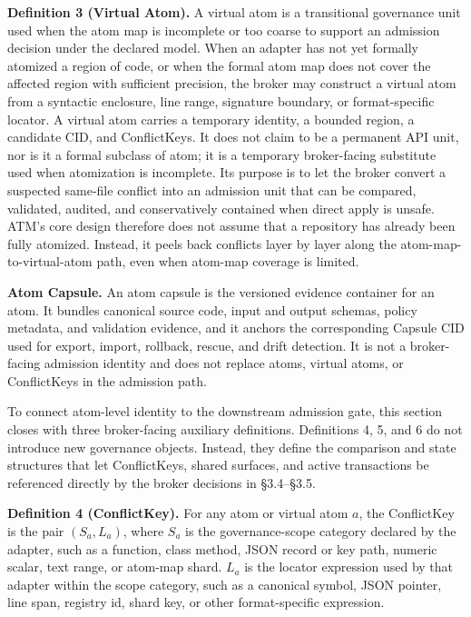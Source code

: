 \documentclass[9pt,letterpaper]{extarticle}
\begin{document}
\textbf{Definition 3 (Virtual Atom).} A virtual atom is a transitional governance unit used when the atom map is incomplete or too coarse to support an admission decision under the declared model. When an adapter has not yet formally atomized a region of code, or when the formal atom map does not cover the affected region with sufficient precision, the broker may construct a virtual atom from a syntactic enclosure, line range, signature boundary, or format-specific locator. A virtual atom carries a temporary identity, a bounded region, a candidate CID, and ConflictKeys. It does not claim to be a permanent API unit, nor is it a formal subclass of atom; it is a temporary broker-facing substitute used when atomization is incomplete. Its purpose is to let the broker convert a suspected same-file conflict into an admission unit that can be compared, validated, audited, and conservatively contained when direct apply is unsafe. ATM's core design therefore does not assume that a repository has already been fully atomized. Instead, it peels back conflicts layer by layer along the atom-map-to-virtual-atom path, even when atom-map coverage is limited.

\textbf{Atom Capsule.} An atom capsule is the versioned evidence container for an atom. It bundles canonical source code, input and output schemas, policy metadata, and validation evidence, and it anchors the corresponding Capsule CID used for export, import, rollback, rescue, and drift detection. It is not a broker-facing admission identity and does not replace atoms, virtual atoms, or ConflictKeys in the admission path.

To connect atom-level identity to the downstream admission gate, this section closes with three broker-facing auxiliary definitions. Definitions 4, 5, and 6 do not introduce new governance objects. Instead, they define the comparison and state structures that let ConflictKeys, shared surfaces, and active transactions be referenced directly by the broker decisions in §3.4--§3.5.

\textbf{Definition 4 (ConflictKey).} For any atom or virtual atom $a$, the ConflictKey is the pair $(S_a, L_a)$, where $S_a$ is the governance-scope category declared by the adapter, such as a function, class method, JSON record or key path, numeric scalar, text range, or atom-map shard. $L_a$ is the locator expression used by that adapter within the scope category, such as a canonical symbol, JSON pointer, line span, registry id, shard key, or other format-specific expression.
\end{document}
